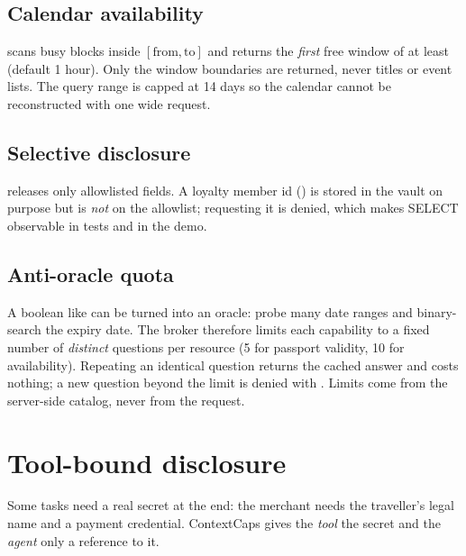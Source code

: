 \documentclass[11pt,a4paper]{article}
\begin{document}
\subsection{Calendar availability}
 scans busy blocks inside \([\text{from},\text{to}]\) and returns the \emph{first} free window of at least  (default 1 hour). Only the window boundaries are returned, never titles or event lists. The query range is capped at 14 days so the calendar cannot be reconstructed with one wide request.

\subsection{Selective disclosure}
 releases only allowlisted fields. A loyalty member id () is stored in the vault on purpose but is \emph{not} on the allowlist; requesting it is denied, which makes SELECT observable in tests and in the demo.

\subsection{Anti-oracle quota}
A boolean like  can be turned into an oracle: probe many date ranges and binary-search the expiry date. The broker therefore limits each capability to a fixed number of \emph{distinct} questions per resource (5 for passport validity, 10 for availability). Repeating an identical question returns the cached answer and costs nothing; a new question beyond the limit is denied with . Limits come from the server-side catalog, never from the request.

\section{Tool-bound disclosure}\label{sec:toolbound}

Some tasks need a real secret at the end: the merchant needs the traveller's legal name and a payment credential. ContextCaps gives the \emph{tool} the secret and the \emph{agent} only a reference to it.
\end{document}
